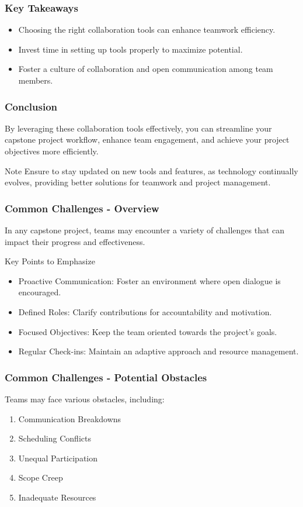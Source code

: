 \documentclass[aspectratio=169]{beamer}
\begin{document}
\begin{frame}[fragile]
    \frametitle{Key Takeaways}
    \begin{itemize}
        \item Choosing the right collaboration tools can enhance teamwork efficiency.
        \item Invest time in setting up tools properly to maximize potential.
        \item Foster a culture of collaboration and open communication among team members.
    \end{itemize}
\end{frame}

\begin{frame}[fragile]
    \frametitle{Conclusion}
    By leveraging these collaboration tools effectively, you can streamline your capstone project workflow, enhance team engagement, and achieve your project objectives more efficiently. 

    \begin{block}{Note}
        Ensure to stay updated on new tools and features, as technology continually evolves, providing better solutions for teamwork and project management.
    \end{block}
\end{frame}

\begin{frame}[fragile]
  \frametitle{Common Challenges - Overview}
  In any capstone project, teams may encounter a variety of challenges that can impact their progress and effectiveness.
  
  \begin{block}{Key Points to Emphasize}
    \begin{itemize}
      \item Proactive Communication: Foster an environment where open dialogue is encouraged.
      \item Defined Roles: Clarify contributions for accountability and motivation.
      \item Focused Objectives: Keep the team oriented towards the project’s goals.
      \item Regular Check-ins: Maintain an adaptive approach and resource management.
    \end{itemize}
  \end{block}
\end{frame}

\begin{frame}[fragile]
  \frametitle{Common Challenges - Potential Obstacles}
  Teams may face various obstacles, including:
  
  \begin{enumerate}
    \item Communication Breakdowns
    \item Scheduling Conflicts
    \item Unequal Participation
    \item Scope Creep
    \item Inadequate Resources
  \end{enumerate}
\end{frame}
\end{document}
